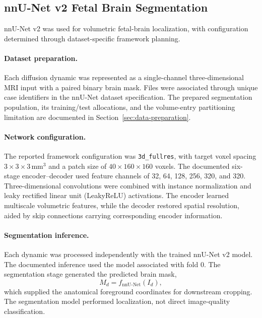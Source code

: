 \subsection{nnU-Net v2 Fetal Brain Segmentation}
\label{subsec:3d_nnunet_architecture}

nnU-Net v2 was used for volumetric fetal-brain localization, with configuration determined through dataset-specific framework planning.

\paragraph{Dataset preparation.}
Each diffusion dynamic was represented as a single-channel three-dimensional MRI input with a paired binary brain mask. Files were associated through unique case identifiers in the nnU-Net dataset specification. The prepared segmentation population, its training/test allocations, and the volume-entry partitioning limitation are documented in Section~\ref{sec:data-preparation}.

\paragraph{Network configuration.}
The reported framework configuration was \texttt{3d\_fullres}, with target voxel spacing $3\times3\times3$\,mm$^3$ and a patch size of $40\times160\times160$ voxels. The documented six-stage encoder--decoder used feature channels of 32, 64, 128, 256, 320, and 320. Three-dimensional convolutions were combined with instance normalization and leaky rectified linear unit (LeakyReLU) activations. The encoder learned multiscale volumetric features, while the decoder restored spatial resolution, aided by skip connections carrying corresponding encoder information.

\paragraph{Segmentation inference.}
Each dynamic was processed independently with the trained nnU-Net v2 model. The documented inference used the model associated with fold 0. The segmentation stage generated the predicted brain mask,
\begin{equation}
M_d=f_{\mathrm{nnU\text{-}Net}}(I_d),
\end{equation}
which supplied the anatomical foreground coordinates for downstream cropping. The segmentation model performed localization, not direct image-quality classification.

